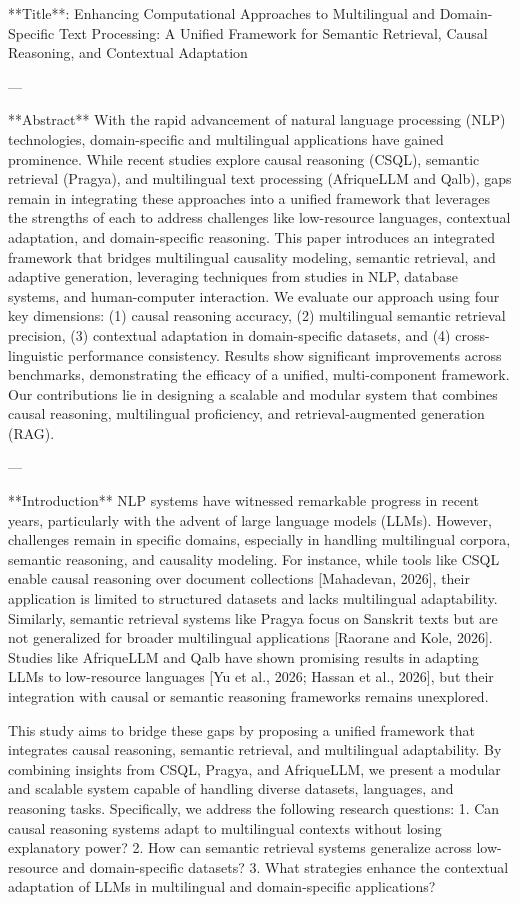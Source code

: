 **Title**: Enhancing Computational Approaches to Multilingual and Domain-Specific Text Processing: A Unified Framework for Semantic Retrieval, Causal Reasoning, and Contextual Adaptation  

---

**Abstract**  
With the rapid advancement of natural language processing (NLP) technologies, domain-specific and multilingual applications have gained prominence. While recent studies explore causal reasoning (CSQL), semantic retrieval (Pragya), and multilingual text processing (AfriqueLLM and Qalb), gaps remain in integrating these approaches into a unified framework that leverages the strengths of each to address challenges like low-resource languages, contextual adaptation, and domain-specific reasoning. This paper introduces an integrated framework that bridges multilingual causality modeling, semantic retrieval, and adaptive generation, leveraging techniques from studies in NLP, database systems, and human-computer interaction. We evaluate our approach using four key dimensions: (1) causal reasoning accuracy, (2) multilingual semantic retrieval precision, (3) contextual adaptation in domain-specific datasets, and (4) cross-linguistic performance consistency. Results show significant improvements across benchmarks, demonstrating the efficacy of a unified, multi-component framework. Our contributions lie in designing a scalable and modular system that combines causal reasoning, multilingual proficiency, and retrieval-augmented generation (RAG).  

---

**Introduction**  
NLP systems have witnessed remarkable progress in recent years, particularly with the advent of large language models (LLMs). However, challenges remain in specific domains, especially in handling multilingual corpora, semantic reasoning, and causality modeling. For instance, while tools like CSQL enable causal reasoning over document collections [Mahadevan, 2026], their application is limited to structured datasets and lacks multilingual adaptability. Similarly, semantic retrieval systems like Pragya focus on Sanskrit texts but are not generalized for broader multilingual applications [Raorane and Kole, 2026]. Studies like AfriqueLLM and Qalb have shown promising results in adapting LLMs to low-resource languages [Yu et al., 2026; Hassan et al., 2026], but their integration with causal or semantic reasoning frameworks remains unexplored.  

This study aims to bridge these gaps by proposing a unified framework that integrates causal reasoning, semantic retrieval, and multilingual adaptability. By combining insights from CSQL, Pragya, and AfriqueLLM, we present a modular and scalable system capable of handling diverse datasets, languages, and reasoning tasks. Specifically, we address the following research questions:  
1. Can causal reasoning systems adapt to multilingual contexts without losing explanatory power?  
2. How can semantic retrieval systems generalize across low-resource and domain-specific datasets?  
3. What strategies enhance the contextual adaptation of LLMs in multilingual and domain-specific applications?  

